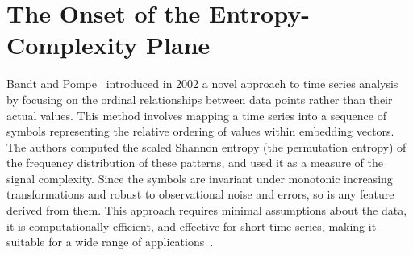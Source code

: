 
\section{The Onset of the Entropy-Complexity Plane}


Bandt and Pompe~\cite{PhysRevLett.88.174102} introduced in 2002 a novel approach to time series analysis by focusing on the ordinal relationships between data points rather than their actual values. 
This method involves mapping a time series into a sequence of symbols representing the relative ordering of values within embedding vectors. 
The authors computed the scaled Shannon entropy (the permutation entropy) of the frequency distribution of these patterns, and used it as a measure of the signal complexity.
Since the symbols are invariant under monotonic increasing transformations and robust to observational noise and errors, 
so is any feature derived from them.
This approach requires minimal assumptions about the data, it is computationally efficient, and effective for short time series, making it suitable for a wide range of applications~\cite{Zanin2012}.

